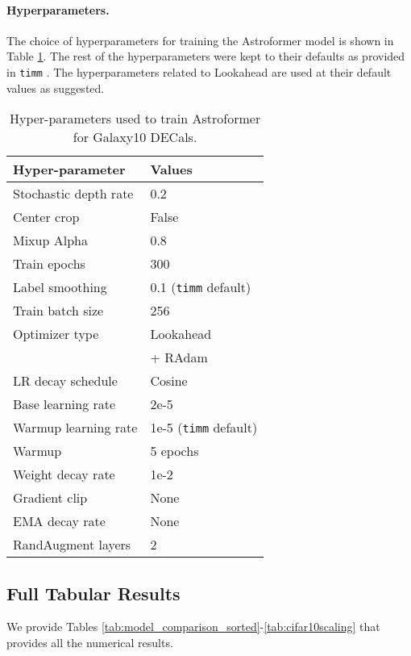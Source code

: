 \documentclass{article} \usepackage{iclr2023_conference,times}
\begin{document}
\paragraph{Hyperparameters. } The choice of hyperparameters for training the Astroformer model is shown in Table \ref{tab:hyperparams}. The rest of the hyperparameters were kept to their defaults as provided in \texttt{timm} \citep{rw2019timm}. The hyperparameters related to Lookahead \citep{NEURIPS2019_90fd4f88} are used at their default values as suggested.

\begin{table}[!ht]
    \caption{Hyper-parameters used to train Astroformer for Galaxy10 DECals.}
    \centering
    \begin{tabular}{ll}
        \toprule
        \textbf{Hyper-parameter} & \textbf{Values} \\
        \midrule
        Stochastic depth rate & 0.2\\
        Center crop & False\\
        Mixup Alpha & 0.8\\
        Train epochs & 300\\
        Label smoothing & 0.1 (\texttt{timm} default)\\
        Train batch size & 256\\
        Optimizer type & Lookahead \citep{NEURIPS2019_90fd4f88} \\ & \quad + RAdam \citep{Liu2020On}\\
        LR decay schedule & Cosine\\
        Base learning rate & 2e-5\\
        Warmup learning rate & 1e-5 (\texttt{timm} default)\\
        Warmup & 5 epochs\\
        Weight decay rate & 1e-2\\
        Gradient clip & None\\
        EMA decay rate & None\\
        RandAugment layers & 2\\
        \bottomrule
    \end{tabular}
    \label{tab:hyperparams}
\end{table}

\subsection{Full Tabular Results}

We provide Tables \ref{tab:model_comparison_sorted}-\ref{tab:cifar10scaling} that provides all the numerical results.
\end{document}
